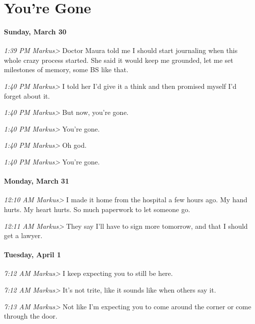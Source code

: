 \hypertarget{youre-gone}{%
\chapter{You're Gone}\label{youre-gone}}

{
\setlength{\parindent}{0cm}
\setlength{\parskip}{5pt}

\subsubsection*{Sunday, March 30}\label{sunday-march-30}

\emph{1:39 PM Markus\textgreater{}} Doctor Maura told me I should start
journaling when this whole crazy process started. She said it would keep
me grounded, let me set milestones of memory, some BS like that.

\emph{1:40 PM Markus\textgreater{}} I told her I'd give it a think and
then promised myself I'd forget about it.

\emph{1:40 PM Markus\textgreater{}} But now, you're gone.

\emph{1:40 PM Markus\textgreater{}} You're gone.

\emph{1:40 PM Markus\textgreater{}} Oh god.

\emph{1:40 PM Markus\textgreater{}} You're gone.

\subsubsection*{Monday, March 31}\label{monday-march-31}

\emph{12:10 AM Markus\textgreater{}} I made it home from the hospital a
few hours ago. My hand hurts. My heart hurts. So much paperwork to let
someone go.

\emph{12:11 AM Markus\textgreater{}} They say I'll have to sign more
tomorrow, and that I should get a lawyer.

\subsubsection*{Tuesday, April 1}\label{tuesday-april-1}

\emph{7:12 AM Markus\textgreater{}} I keep expecting you to still be
here.

\emph{7:12 AM Markus\textgreater{}} It's not trite, like it sounds like
when others say it.

\emph{7:13 AM Markus\textgreater{}} Not like I'm expecting you to come
around the corner or come through the door.

}
